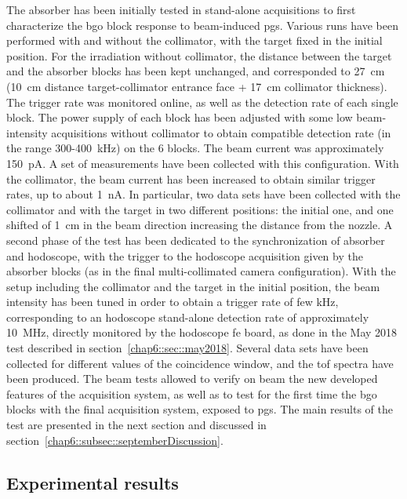 The absorber has been initially tested in stand-alone acquisitions to first characterize the \gls{bgo} block response to beam-induced \glspl{pg}. Various runs have been performed with and without the collimator, with the target fixed in the initial position. For the irradiation without collimator, the distance between the target and the absorber blocks has been kept unchanged, and corresponded to 27~cm (10~cm distance target-collimator entrance face + 17~cm collimator thickness). The trigger rate was monitored online, as well as the detection rate of each single block. The power supply of each block has been adjusted with some low beam-intensity acquisitions without collimator to obtain compatible detection rate (in the range 300-400~kHz) on the 6 blocks. The beam current was approximately 150~pA. A set of measurements have been collected with this configuration. With the collimator, the beam current has been increased to obtain similar trigger rates, up to about 1~nA. In particular, two data sets have been collected with the collimator and with the target in two different positions: the initial one, and one shifted of 1~cm in the beam direction increasing the distance from the nozzle.
A second phase of the test has been dedicated to the synchronization of absorber and hodoscope, with the trigger to the hodoscope acquisition given by the absorber blocks (as in the final multi-collimated camera configuration). With the setup including the collimator and the target in the initial position, the beam intensity has been tuned in order to obtain a trigger rate of few kHz, corresponding to an hodoscope stand-alone detection rate of approximately 10~MHz, directly monitored by the hodoscope \gls{fe} board, as done in the May 2018 test described in section~\ref{chap6::sec::may2018}. Several data sets have been collected for different values of the coincidence window, and the \gls{tof} spectra have been produced.
The beam tests allowed to verify on beam the new developed features of the acquisition system, as well as to test for the first time the \gls{bgo} blocks with the final acquisition system, exposed to \glspl{pg}. The main results of the test are presented in the next section and discussed in section~\ref{chap6::subsec::septemberDiscussion}. 
   

\subsection{Experimental results}\label{chap6::subsec::septemberResults} 

